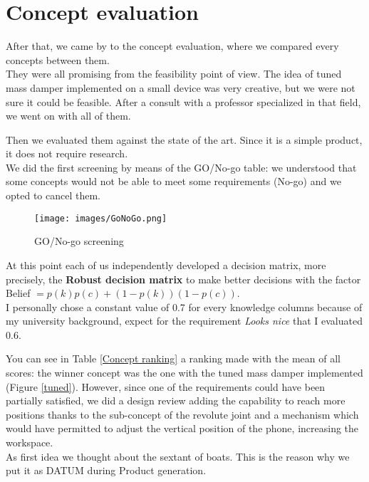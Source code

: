 \documentclass[11pt,a4paper]{article}
\begin{document}
	\newpage

\section{Concept evaluation}
	After that, we came by to the concept evaluation, where we compared every concepts between them. \\
	They were all promising from the feasibility point of view. The idea of tuned mass damper implemented on a small device was very creative, but we were not sure it could be feasible. After a consult with a professor specialized in that field, we went on with all of them.
	
	\smallskip
	
	Then we evaluated them against the state of the art. Since it is a simple product, it does not require research. \\
	We did the first screening by means of the GO/No-go table: we understood that some concepts would not be able to meet some requirements (No-go) and we opted to cancel them.
	
	\bigskip
	
	\begin{figure}[H]
		\centering
		\texttt{[image: images/GoNoGo.png]}
		\caption{GO/No-go screening}
		\label{GO/No-go screening}
	\end{figure}
	
	At this point each of us independently developed a decision matrix, more precisely, the \textbf{Robust decision matrix} to make better decisions with the factor Belief $=p(k)p(c) + (1-p(k))(1-p(c))$. \\
	I personally chose a constant value of 0.7 for every knowledge columns because of my university background, expect for the requirement \emph{Looks nice} that I evaluated 0.6.
	
	\smallskip
	
	You can see in Table \ref{Concept ranking} a ranking made with the mean of all scores: the winner concept was the one with the tuned mass damper implemented (Figure \ref{tuned}). However, since one of the requirements could have been partially satisfied, we did a design review adding the capability to reach more positions thanks to the sub-concept of the revolute joint and a mechanism which would have permitted to adjust the vertical position of the phone, increasing the workspace.\\
	As first idea we thought about the sextant of boats. This is the reason why we put it as DATUM during Product generation.
	
\end{document}
